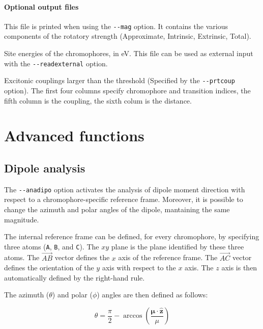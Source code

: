 \documentclass[a4paper,11pt]{article}
\newcommand{\bs}{\boldsymbol}
\begin{document}
\paragraph*{Optional output files}
\begin{description}[labelsep=10pt, align=left, labelwidth=85pt,labelindent=0pt,leftmargin=95pt]
\item[\texttt{component.out}] This file is printed when using the \texttt{-{}-mag} option. It contains the various components of the rotatory strength (Approximate, Intrinsic, Extrinsic, Total).
\item[\texttt{site.out}] Site energies of the chromophores, in eV. This file can be used as external input with the \texttt{-{}-readexternal} option.
\item[\texttt{coup.out}] Excitonic couplings larger than the threshold (Specified by the \texttt{-{}-prtcoup} option). The first four columns specify chromophore and transition indices, the fifth column is the coupling, the sixth colum is the distance.
\end{description}


\section{Advanced functions}

\subsection{Dipole analysis}\label{sec:anadipo}

The \texttt{-{}-anadipo} option activates the analysis of dipole moment direction with respect to a chromophore-specific reference frame. Moreover, it is possible to change the azimuth and polar angles of the dipole, mantaining the same magnitude.

The internal reference frame can be defined, for every chromophore, by specifying three atoms (\texttt{A}, \texttt{B}, and \texttt{C}). The $xy$ plane is the plane identified by these three atoms. The $\vec{AB}$ vector defines the $x$ axis of the reference frame. The $\vec{AC}$ vector defines the orientation of the $y$ axis with respect to the $x$ axis. The $z$ axis is then automatically defined by the right-hand rule. 

The azimuth ($\theta$) and polar ($\phi$) angles are then defined as follows: 

\begin{equation}\label{eq:deftheta}
 \theta = \dfrac{\pi}{2} - \arccos\left(\dfrac{\bs{\mu}\cdot\hat{\mathbf{z}}}{\mu}\right)
\end{equation}
\end{document}
